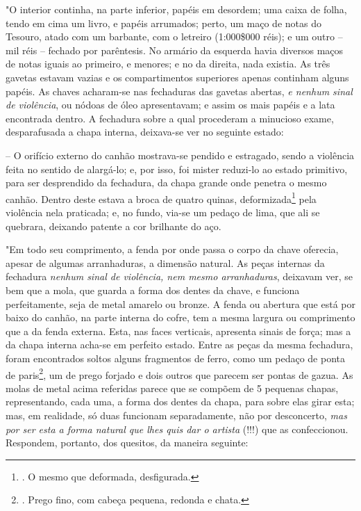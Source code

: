 "O interior continha, na parte inferior, papéis em desordem; uma caixa
de folha, tendo em cima um livro, e papéis arrumados; perto, um maço de
notas do Tesouro, atado com um barbante, com o letreiro (1:000\$000
réis); e um outro -- mil réis -- fechado por parêntesis. No armário da
esquerda havia diversos maços de notas iguais ao primeiro, e menores; e
no da direita, nada existia. As três gavetas estavam vazias e os
compartimentos superiores apenas continham alguns papéis. As chaves
acharam-se nas fechaduras das gavetas abertas, \emph{e nenhum sinal de
violência}, ou nódoas de óleo apresentavam; e assim os mais papéis e a
lata encontrada dentro. A fechadura sobre a qual procederam a minucioso
exame, desparafusada a chapa interna, deixava-se ver no seguinte estado:

-- O orifício externo do canhão mostrava-se pendido e estragado, sendo a
violência feita no sentido de alargá-lo; e, por isso, foi mister
reduzi-lo ao estado primitivo, para ser desprendido da fechadura, da
chapa grande onde penetra o mesmo canhão. Dentro deste estava a broca de
quatro quinas, deformizada\footnote{. O mesmo que deformada,
  desfigurada.} pela violência nela praticada; e, no fundo, via-se um
pedaço de lima, que ali se quebrara, deixando patente a cor brilhante do
aço.

"Em todo seu comprimento, a fenda por onde passa o corpo da chave
oferecia, apesar de algumas arranhaduras, a dimensão natural. As peças
internas da fechadura \emph{nenhum sinal de violência, nem mesmo
arranhaduras}, deixavam ver, se bem que a mola, que guarda a forma dos
dentes da chave, e funciona perfeitamente, seja de metal amarelo ou
bronze. A fenda ou abertura que está por baixo do canhão, na parte
interna do cofre, tem a mesma largura ou comprimento que a da fenda
externa. Esta, nas faces verticais, apresenta sinais de força; mas a da
chapa interna acha-se em perfeito estado. Entre as peças da mesma
fechadura, foram encontrados soltos alguns fragmentos de ferro, como um
pedaço de ponta de paris\footnote{. Prego fino, com cabeça pequena,
  redonda e chata.}, um de prego forjado e dois outros que parecem ser
pontas de gazua. As molas de metal acima referidas parece que se compõem
de 5 pequenas chapas, representando, cada uma, a forma dos dentes da
chapa, para sobre elas girar esta; mas, em realidade, só duas funcionam
separadamente, não por desconcerto, \emph{mas por ser esta a forma
natural que lhes quis dar o artista} (!!!) que as confeccionou.
Respondem, portanto, dos quesitos, da maneira seguinte:

